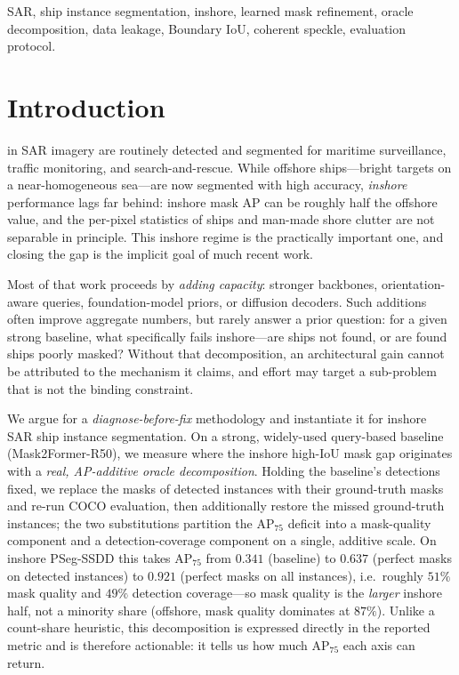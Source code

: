 \begin{IEEEkeywords}
SAR, ship instance segmentation, inshore, learned mask refinement, oracle decomposition, data leakage, Boundary IoU, coherent speckle, evaluation protocol.
\end{IEEEkeywords}

\section{Introduction}
\label{sec:intro}
 in SAR imagery are routinely detected and segmented for maritime surveillance, traffic monitoring, and search-and-rescue. While offshore ships---bright targets on a near-homogeneous sea---are now segmented with high accuracy, \emph{inshore} performance lags far behind: inshore mask AP can be roughly half the offshore value, and the per-pixel statistics of ships and man-made shore clutter are not separable in principle. This inshore regime is the practically important one, and closing the gap is the implicit goal of much recent work.

Most of that work proceeds by \emph{adding capacity}: stronger backbones, orientation-aware queries, foundation-model priors, or diffusion decoders. Such additions often improve aggregate numbers, but rarely answer a prior question: for a given strong baseline, what specifically fails inshore---are ships not found, or are found ships poorly masked? Without that decomposition, an architectural gain cannot be attributed to the mechanism it claims, and effort may target a sub-problem that is not the binding constraint.

We argue for a \emph{diagnose-before-fix} methodology and instantiate it for inshore SAR ship instance segmentation. On a strong, widely-used query-based baseline (Mask2Former-R50), we measure where the inshore high-IoU mask gap originates with a \emph{real, AP-additive oracle decomposition}. Holding the baseline's detections fixed, we replace the masks of detected instances with their ground-truth masks and re-run COCO evaluation, then additionally restore the missed ground-truth instances; the two substitutions partition the AP$_{75}$ deficit into a mask-quality component and a detection-coverage component on a single, additive scale. On inshore PSeg-SSDD this takes AP$_{75}$ from $0.341$ (baseline) to $0.637$ (perfect masks on detected instances) to $0.921$ (perfect masks on all instances), i.e.\ roughly $51\%$ mask quality and $49\%$ detection coverage---so mask quality is the \emph{larger} inshore half, not a minority share (offshore, mask quality dominates at $87\%$). Unlike a count-share heuristic, this decomposition is expressed directly in the reported metric and is therefore actionable: it tells us how much AP$_{75}$ each axis can return.

